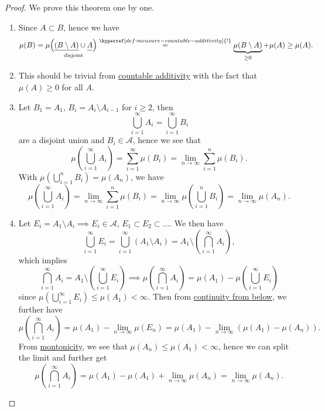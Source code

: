 \begin{proof}
	We prove this theorem one by one.
	\begin{enumerate}
		\item Since \(A\subset B\), hence we have
		      \[
			      \mu(B) = \mu\underset{\text{disjoint} }{\left(\underline{(B\setminus A)}\cup \underline{\vphantom{(B\setminus A)}A}\right)} \overset{\hyperref[def:measure-countable-additivity]{!}}{=} \underbrace{\mu(B\setminus A)}_{\geq 0} + \mu(A) \geq \mu(A).
		      \]
		\item This should be trivial from \hyperref[def:measure-countable-additivity]{countable additivity} with the fact that \(\mu(A)\geq 0\) for all \(A\). 
		\item Let \(B_1 = A_1\), \(B_{i} = A_{i} \setminus A_{i-1}\) for \(i\geq 2\), then
		      \[
			      \bigcup\limits_{i=1}^{\infty} A_{i} = \bigcup\limits_{i=1}^{\infty} B_{i}
		      \]
		      are a disjoint union and \(B_{i}\in \mathcal{A}\), hence we see that
		      \[
			      \mu\left(\bigcup\limits_{i=1}^{\infty} A_{i}\right) = \sum\limits_{i=1}^{\infty} \mu(B_{i}) = \lim\limits_{n \to \infty} \sum\limits_{i=1}^{n} \mu(B_{i}).
		      \]
		      With \(\mu\left(\bigcup\limits_{i=1}^{n} B_{i}\right) = \mu(A_{n})\), we have
		      \[
			      \mu\left(\bigcup\limits_{i=1}^{\infty} A_{i}\right) = \lim\limits_{n \to \infty} \sum\limits_{i=1}^{n} \mu(B_{i}) = \lim\limits_{n \to \infty} \mu\left(\bigcup\limits_{i=1}^{n} B_{i}\right) = \lim\limits_{n \to \infty} \mu(A_{n}).
		      \]
		\item Let \(E_{i} = A_{1} \setminus A_{i} \implies E_{i}\in \mathcal{A}\), \(E_1\subset E_2\subset \ldots\). We then have
		      \[
			      \bigcup\limits_{i=1}^{\infty} E_{i} = \bigcup\limits_{i=1}^{\infty} \left(A_1 \setminus A_{i}\right) = A_1 \setminus \left(\bigcap\limits_{i=1}^{\infty} A_{i}\right),
		      \]
		      which implies
		      \[
			      \bigcap\limits_{i=1}^{\infty} A_{i} = A_1 \setminus \left(\bigcup\limits_{i=1}^{\infty} E_{i}\right) \implies \mu\left(\bigcap\limits_{i=1}^{\infty} A_{i}\right) = \mu(A_1) - \mu\left(\bigcup\limits_{i=1}^{\infty} E_{i}\right)
		      \]
		      since \(\mu\left(\bigcup\limits_{i=1}^{\infty} E_{i}\right) \leq \mu(A_1) < \infty \). Then from \hyperref[thm:measure-space-continuity-from-below]{continuity from below}, we further have
		      \[
			      \mu\left(\bigcap\limits_{i=1}^{\infty} A_{i}\right) = \mu(A_1) - \lim\limits_{n \to \infty} \mu(E_{n}) = \mu(A_1) - \lim\limits_{n \to \infty} \left(\mu(A_1) - \mu(A_{n})\right).
		      \]
		      From \hyperref[thm:montonicity]{montonicity}, we see that \(\mu(A_{n})\leq \mu(A_1) < \infty\), hence we can split the limit and further get
		      \[
			      \mu\left(\bigcap\limits_{i=1}^{\infty} A_{i}\right) = \mu(A_1) - \mu(A_1) + \lim\limits_{n \to \infty} \mu(A_{n}) = \lim\limits_{n \to \infty} \mu(A_{n}).
		      \]
	\end{enumerate}
\end{proof}

